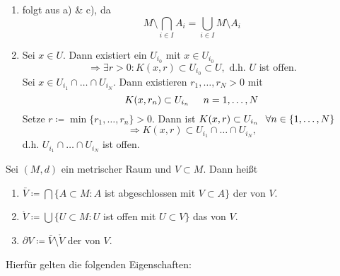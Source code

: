 \begin{prop}
\begin{beweis}
\begin{enumerate}[label=\alph*\upshape)]
			\item folgt aus a) \& c), da
				\[ M \setminus \bigcap_{i \in I} A_{i} = \bigcup_{i \in I} M \setminus A_{i} \]
			\item Sei $x \in U$. Dann existiert ein $U_{i_{0}}$ mit $x \in U_{i_{0}}$
			\[ \Rightarrow \exists r > 0: K(x, r) \subset U_{i_{0}} \subset U, \text{ d.h. } U \text{ ist offen.}  \]
			Sei $x \in U_{i_{1}} \cap \dotsc \cap U_{i_{N}}.$ Dann existieren $r_{1}, \dotsc, r_{N} > 0$ mit
			\[ K(x, r_{n}) \subset U_{i_{n}} \hspace{0.5cm} n = 1, \dotsc, N \]
			Setze $r \coloneqq \min \{ r_{1}, \dotsc, r_{n} \} > 0$. Dann ist $K(x, r) \subset U_{i_{n}} \hspace{0.25cm} \forall n \in \{ 1, \dotsc, N \}$
			\[ \Rightarrow K(x, r) \subset U_{i_{1}} \cap \dotsc \cap U_{i_{N}}, \]
			d.h. $U_{i_{1}} \cap \dotsc \cap U_{i_{N}}$ ist offen.
		\end{enumerate}	
	\end{beweis}
\end{prop}


\begin{definition} \label{def:4.7-AbschlussInnereRand}
	Sei $(M, d)$ ein metrischer Raum und $V \subset M$. Dann hei{\ss}t 
	\begin{enumerate}[label=\alph*\upshape)]
		\item $\bar V \coloneqq \bigcap \{ A \subset M: A$ ist abgeschlossen mit $V \subset A \} $ der  von $V$.
		\item $\mathring V \coloneqq \bigcup \{ U \subset M: U$ ist offen mit $U \subset V \}$ das  von $V$. 
		\item $ \partial V \coloneqq \bar V \setminus \mathring V$ der  von $V$.
	\end{enumerate}
\end{definition}


Hierfür gelten die folgenden Eigenschaften:


